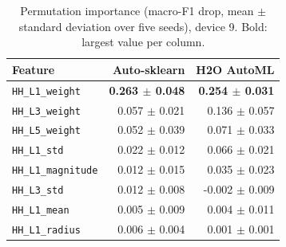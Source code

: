 \begin{table}[t]
\centering
\caption{Permutation importance (macro-F1 drop, mean $\pm$ standard deviation over five seeds), device 9. Bold: largest value per column.}
\label{tab:pfi}
\scriptsize
\setlength{\tabcolsep}{3pt}
\begin{tabular}{@{}lrr@{}}
\toprule
Feature & Auto-sklearn & H2O AutoML \\
\midrule
\texttt{HH\_L1\_weight} & \textbf{0.263 $\pm$ 0.048} & \textbf{0.254 $\pm$ 0.031} \\
\texttt{HH\_L3\_weight} & 0.057 $\pm$ 0.021 & 0.136 $\pm$ 0.057 \\
\texttt{HH\_L5\_weight} & 0.052 $\pm$ 0.039 & 0.071 $\pm$ 0.033 \\
\texttt{HH\_L1\_std} & 0.022 $\pm$ 0.012 & 0.066 $\pm$ 0.021 \\
\texttt{HH\_L1\_magnitude} & 0.012 $\pm$ 0.015 & 0.035 $\pm$ 0.023 \\
\texttt{HH\_L3\_std} & 0.012 $\pm$ 0.008 & -0.002 $\pm$ 0.009 \\
\texttt{HH\_L1\_mean} & 0.005 $\pm$ 0.009 & 0.004 $\pm$ 0.011 \\
\texttt{HH\_L1\_radius} & 0.006 $\pm$ 0.004 & 0.001 $\pm$ 0.001 \\
\bottomrule
\end{tabular}
\end{table}
